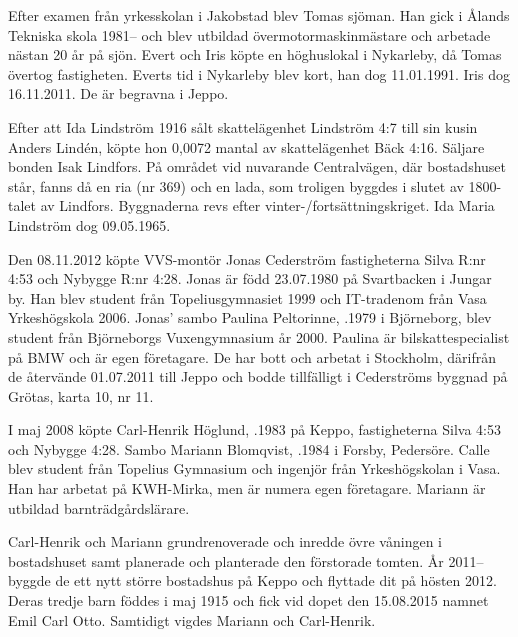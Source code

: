 Efter examen från yrkesskolan i Jakobstad blev Tomas sjöman. Han gick i Ålands Tekniska skola 1981-- och blev utbildad övermotormaskinmästare och arbetade nästan 20 år på sjön. Evert och Iris köpte en höghuslokal i Nykarleby, då Tomas övertog fastigheten. Everts tid i Nykarleby blev kort, han dog 11.01.1991. Iris dog 16.11.2011. De är begravna i Jeppo.


Efter att Ida Lindström 1916 sålt skattelägenhet Lindström 4:7 till sin	kusin Anders Lindén, köpte hon 0,0072 mantal av skattelägenhet Bäck 4:16. Säljare bonden Isak Lindfors. På området vid nuvarande Centralvägen, där bostadshuset står, fanns då en ria (nr 369) och en lada, som troligen byggdes i slutet av 1800-talet av Lindfors. Byggnaderna revs efter vinter-/fortsättningskriget. Ida Maria Lindström dog 09.05.1965.






Den 08.11.2012 köpte VVS-montör Jonas Cederström fastigheterna Silva R:nr 4:53 och Nybygge R:nr 4:28. Jonas är född 23.07.1980 på Svartbacken i Jungar by. Han blev student från Topeliusgymnasiet 1999 och IT-tradenom från Vasa Yrkeshögskola 2006. Jonas' sambo Paulina Peltorinne, .1979 i Björneborg, blev student från Björneborgs Vuxengymnasium år 2000. Paulina är bilskattespecialist på BMW och är egen företagare. De har bott och arbetat i Stockholm, därifrån de återvände 01.07.2011 till Jeppo och bodde tillfälligt i Cederströms byggnad på Grötas, karta 10, nr 11.
\begin{jhchildren}
  \item {}
  \item {}
\end{jhchildren}


I maj 2008 köpte Carl-Henrik Höglund, .1983 på Keppo, fastigheterna Silva 4:53 och Nybygge 4:28. Sambo Mariann Blomqvist, .1984 i Forsby, Pedersöre. Calle blev student från Topelius Gymnasium och ingenjör från Yrkeshögskolan i Vasa. Han har arbetat på KWH-Mirka, men är numera egen företagare. Mariann är utbildad barnträdgårdslärare.
\begin{jhchildren}
  \item {}
  \item {}
  \item {}
\end{jhchildren}
Carl-Henrik och Mariann grundrenoverade och inredde övre våningen i bostadshuset samt planerade och planterade den förstorade tomten. År 2011-- byggde de ett nytt större bostadshus på Keppo och flyttade dit på hösten 2012. Deras tredje barn föddes i maj 1915 och fick vid dopet den 15.08.2015 namnet Emil Carl Otto. Samtidigt vigdes Mariann och Carl-Henrik.


